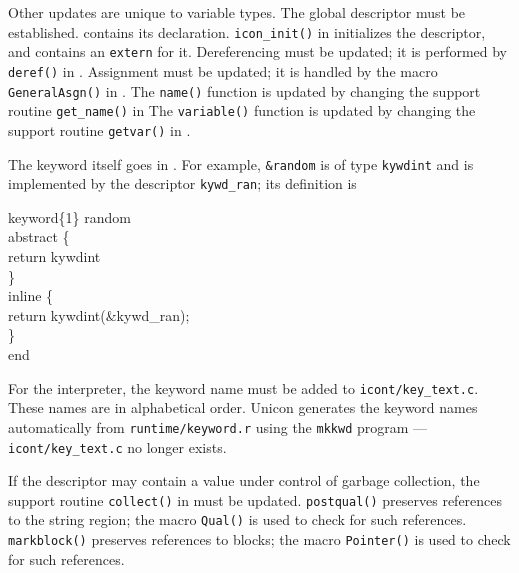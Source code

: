 Other updates are unique to variable types. The global descriptor must be
established.  contains its declaration.
\texttt{icon\_init()} in  initializes the descriptor,
and  contains an \texttt{extern} for it. Dereferencing
must be updated; it is performed by \texttt{deref()} in .
Assignment must be updated; it is handled by the macro \texttt{GeneralAsgn()}
in . The \texttt{name()} function is updated by
changing the support routine \texttt{get\_name()} in 
The \texttt{variable()} function is updated by changing the support
routine \texttt{getvar()} in .

The keyword itself goes in . For example,
\texttt{\&random} is of type \texttt{kywdint} and is implemented by the descriptor
\texttt{kywd\_ran}; its definition is
\begin{iconcode}
keyword\{1\} random\\
\>abstract \{\\
\>\>return kywdint\\
\>\}\\
\>inline \{\\
\>\>return kywdint(\&kywd\_ran);\\
\>\}\\
end
\end{iconcode}
\noindent
For the interpreter, the keyword name must be added to
\texttt{icont/key\_text.c}. These names are in alphabetical order.
{\color{blue} Unicon generates the keyword names automatically
from \texttt{runtime/keyword.r} using the \texttt{mkkwd} program
--- \texttt{icont/key\_text.c} no longer exists.}

If the descriptor may contain a value under control of garbage collection,
the support routine \texttt{collect()} in  must be
updated. \texttt{postqual()} preserves references to the string region;
the macro \texttt{Qual()} is used to check for such references.
\texttt{markblock()} preserves references to blocks; the macro \texttt{Pointer()}
is used to check for such references.

\clearpage
\newpage

